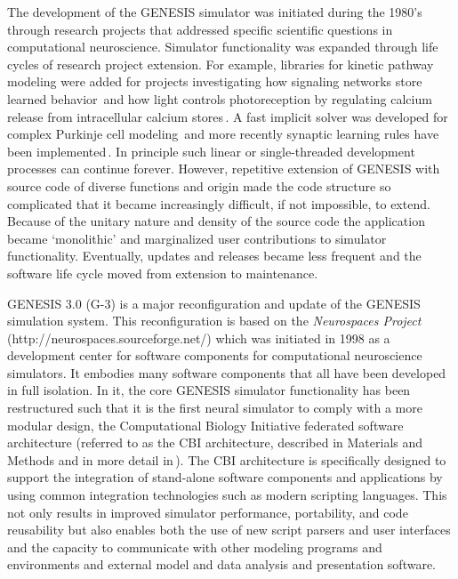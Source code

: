 \documentclass[10pt]{article}
\begin{document}
The development of the GENESIS simulator was initiated during
the 1980's through research projects that addressed specific
scientific questions in computational neuroscience. Simulator functionality was
expanded through life cycles of research project extension.
For example, libraries for kinetic pathway modeling were added for
projects investigating how signaling networks store learned
behavior\,\cite{bhalla99:_emerg} and how light controls photoreception by regulating calcium release from
intracellular calcium stores\,\cite{blackwell00:_eviden_distin_light_induc_calcium}.
A fast implicit solver was developed for
complex Purkinje cell modeling\,\cite{deschutter94:_purkin_i,
  deschutter94:_purkin_ii} and more recently synaptic learning rules
have been
implemented\,\cite{guenay08:_chann_densit_distr_explain_spikin}.  In
principle such linear or single-threaded development processes can
continue forever.  However, repetitive extension of GENESIS
with source code of diverse functions and origin
made the code structure so complicated that it became increasingly
difficult, if not impossible, to extend.  Because of the unitary nature and density of
the source code the application became `monolithic'
and marginalized user contributions to simulator functionality. 
Eventually, updates and releases became less frequent
and the software life cycle moved from extension to maintenance.


GENESIS 3.0 (G-3) is a major reconfiguration and update of the GENESIS
simulation system.  This reconfiguration is based on the {\it Neurospaces Project} (http://neurospaces.sourceforge.net/) which was initiated in 1998 as a development center for software components for computational neuroscience simulators. It embodies many software components that all have been developed in full isolation. In it, the core GENESIS simulator functionality has been
restructured such that it is the first neural simulator to comply with a more modular design, the Computational 
Biology Initiative federated software architecture (referred to as the CBI
 architecture, described in Materials and Methods and in more detail in\,\cite{cornelis11b}). The CBI
architecture is specifically designed to support
the integration of stand-alone software components and applications by
using common integration technologies such as modern scripting
languages. This not only results in
improved simulator performance, portability, and code reusability but also enables both the
use of new script parsers and user interfaces and the capacity
to communicate with other modeling programs and environments and external model and data analysis and presentation software.
\end{document}
